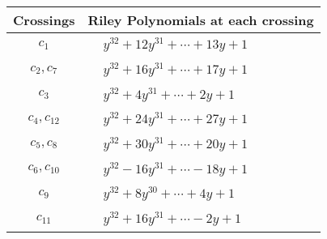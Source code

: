 \documentclass[1p]{elsarticle_modified}
\theoremstyle{definition}
\begin{document}
\begin{tabular}{m{50pt}|m{274pt}}
Crossings & \hspace{64pt}Riley Polynomials at each crossing \\
\hline $$\begin{aligned}c_{1}\end{aligned}$$&$\begin{aligned}
&y^{32}+12 y^{31}+\cdots+13 y+1
\end{aligned}$\\
\hline $$\begin{aligned}c_{2},c_{7}\end{aligned}$$&$\begin{aligned}
&y^{32}+16 y^{31}+\cdots+17 y+1
\end{aligned}$\\
\hline $$\begin{aligned}c_{3}\end{aligned}$$&$\begin{aligned}
&y^{32}+4 y^{31}+\cdots+2 y+1
\end{aligned}$\\
\hline $$\begin{aligned}c_{4},c_{12}\end{aligned}$$&$\begin{aligned}
&y^{32}+24 y^{31}+\cdots+27 y+1
\end{aligned}$\\
\hline $$\begin{aligned}c_{5},c_{8}\end{aligned}$$&$\begin{aligned}
&y^{32}+30 y^{31}+\cdots+20 y+1
\end{aligned}$\\
\hline $$\begin{aligned}c_{6},c_{10}\end{aligned}$$&$\begin{aligned}
&y^{32}-16 y^{31}+\cdots-18 y+1
\end{aligned}$\\
\hline $$\begin{aligned}c_{9}\end{aligned}$$&$\begin{aligned}
&y^{32}+8 y^{30}+\cdots+4 y+1
\end{aligned}$\\
\hline $$\begin{aligned}c_{11}\end{aligned}$$&$\begin{aligned}
&y^{32}+16 y^{31}+\cdots-2 y+1
\end{aligned}$\\
\hline
\end{tabular}\\~\\
\end{document}
